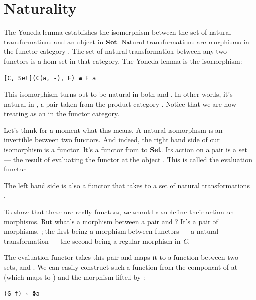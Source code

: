 \section{Naturality}\label{naturality}

The Yoneda lemma establishes the isomorphism between the set of natural
transformations and an object in \textbf{Set}. Natural transformations
are morphisms in the functor category \code{{[}C,\ Set{]}}. The set of
natural transformation between any two functors is a hom-set in that
category. The Yoneda lemma is the isomorphism:

\begin{Verbatim}[commandchars=\\\{\}]
[C, Set](C(a, -), F) ≅ F a
\end{Verbatim}

This isomorphism turns out to be natural in both  and
. In other words, it's natural in , a pair
taken from the product category . Notice
that we are now treating  as an  in the functor
category.

Let's think for a moment what this means. A natural isomorphism is an
invertible  between two functors. And
indeed, the right hand side of our isomorphism is a functor. It's a
functor from  to \textbf{Set}. Its action on
a pair  is a set --- the result of evaluating the
functor  at the object . This is called the
evaluation functor.

The left hand side is also a functor that takes  to a
set of natural transformations .

To show that these are really functors, we should also define their
action on morphisms. But what's a morphism between a pair
 and ? It's a pair of morphisms,
; the first being a morphism between functors --- a
natural transformation --- the second being a regular morphism in
\emph{C}.

The evaluation functor takes this pair  and maps it to a
function between two sets,  and . We can
easily construct such a function from the component of  at
 (which maps  to ) and the morphism
 lifted by :

\begin{Verbatim}[commandchars=\\\{\}]
(G f) ◦ Φa
\end{Verbatim}

